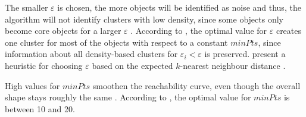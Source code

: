 The smaller $\varepsilon$ is chosen, the more objects will be identified as noise and thus, the algorithm will not identify clusters with low density, 
since some objects only become core objects for a larger $\varepsilon$ \cite{OPTICS1999}.
According to \citeauthor{OPTICS1999}, the optimal value for $\varepsilon$ creates one cluster for most of the objects with respect to a constant $minPts$,
since information about all density-based clusters for $\varepsilon_i < \varepsilon$ is preserved.
\citeauthor{OPTICS1999} present a heuristic for choosing $\varepsilon$ based on the expected $k$-nearest neighbour distance \cite{OPTICS1999}.

High values for $minPts$ smoothen the reachability curve, even though the overall shape stays roughly the same \cite{OPTICS1999}.
According to \citeauthor{OPTICS1999}, the optimal value for $minPts$ is between 10 and 20.